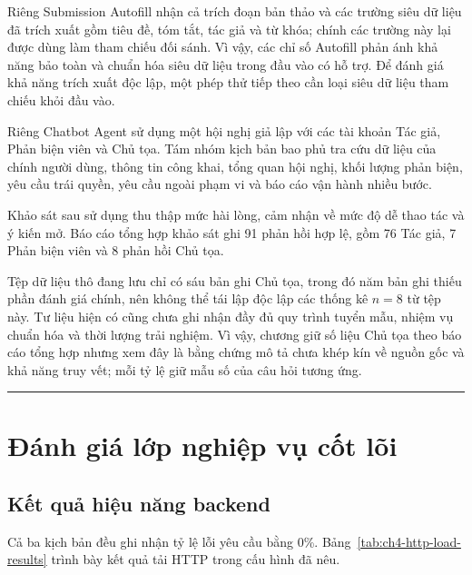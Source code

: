 Riêng Submission Autofill nhận cả trích đoạn bản thảo và các trường siêu dữ liệu đã trích xuất gồm tiêu đề, tóm tắt, tác giả và từ khóa; chính các trường này lại được dùng làm tham chiếu đối sánh. Vì vậy, các chỉ số Autofill phản ánh khả năng bảo toàn và chuẩn hóa siêu dữ liệu trong đầu vào có hỗ trợ. Để đánh giá khả năng trích xuất độc lập, một phép thử tiếp theo cần loại siêu dữ liệu tham chiếu khỏi đầu vào.

Riêng Chatbot Agent sử dụng một hội nghị giả lập với các tài khoản Tác giả, Phản biện viên và Chủ tọa. Tám nhóm kịch bản bao phủ tra cứu dữ liệu của chính người dùng, thông tin công khai, tổng quan hội nghị, khối lượng phản biện, yêu cầu trái quyền, yêu cầu ngoài phạm vi và báo cáo vận hành nhiều bước.

Khảo sát sau sử dụng thu thập mức hài lòng, cảm nhận về mức độ dễ thao tác và ý kiến mở. Báo cáo tổng hợp khảo sát ghi 91 phản hồi hợp lệ, gồm 76 Tác giả, 7 Phản biện viên và 8 phản hồi Chủ tọa.

Tệp dữ liệu thô đang lưu chỉ có sáu bản ghi Chủ tọa, trong đó năm bản ghi thiếu phần đánh giá chính, nên không thể tái lập độc lập các thống kê $n=8$ từ tệp này. Tư liệu hiện có cũng chưa ghi nhận đầy đủ quy trình tuyển mẫu, nhiệm vụ chuẩn hóa và thời lượng trải nghiệm. Vì vậy, chương giữ số liệu Chủ tọa theo báo cáo tổng hợp nhưng xem đây là bằng chứng mô tả chưa khép kín về nguồn gốc và khả năng truy vết; mỗi tỷ lệ giữ mẫu số của câu hỏi tương ứng.

\par\noindent\rule{\textwidth}{0.4pt}\par

\section{Đánh giá lớp nghiệp vụ cốt lõi}

\subsection{Kết quả hiệu năng backend}

Cả ba kịch bản đều ghi nhận tỷ lệ lỗi yêu cầu bằng 0\%. Bảng~\ref{tab:ch4-http-load-results} trình bày kết quả tải HTTP trong cấu hình đã nêu.

